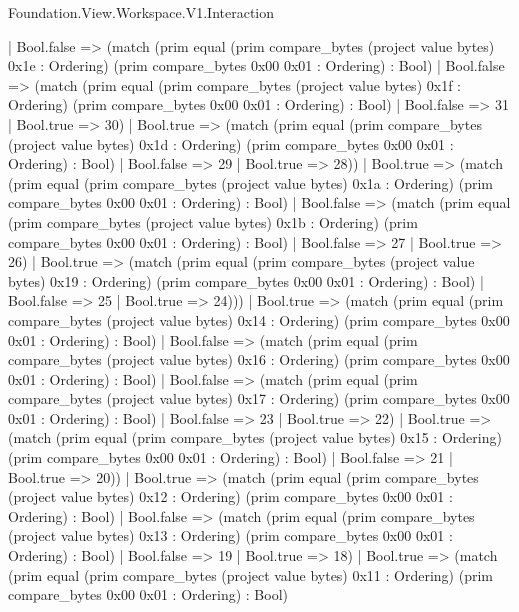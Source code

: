 \begin{lexlean}{Foundation.View.Workspace.V1.Interaction}
\begin{semanticmodule}
{                | Bool.false => (match (prim equal (prim compare_bytes (project value bytes) 0x1e : Ordering) (prim compare_bytes 0x00 0x01 : Ordering) : Bool)
                  | Bool.false => (match (prim equal (prim compare_bytes (project value bytes) 0x1f : Ordering) (prim compare_bytes 0x00 0x01 : Ordering) : Bool)
                    | Bool.false => 31
                    | Bool.true => 30)
                  | Bool.true => (match (prim equal (prim compare_bytes (project value bytes) 0x1d : Ordering) (prim compare_bytes 0x00 0x01 : Ordering) : Bool)
                    | Bool.false => 29
                    | Bool.true => 28))
                | Bool.true => (match (prim equal (prim compare_bytes (project value bytes) 0x1a : Ordering) (prim compare_bytes 0x00 0x01 : Ordering) : Bool)
                  | Bool.false => (match (prim equal (prim compare_bytes (project value bytes) 0x1b : Ordering) (prim compare_bytes 0x00 0x01 : Ordering) : Bool)
                    | Bool.false => 27
                    | Bool.true => 26)
                  | Bool.true => (match (prim equal (prim compare_bytes (project value bytes) 0x19 : Ordering) (prim compare_bytes 0x00 0x01 : Ordering) : Bool)
                    | Bool.false => 25
                    | Bool.true => 24)))
              | Bool.true => (match (prim equal (prim compare_bytes (project value bytes) 0x14 : Ordering) (prim compare_bytes 0x00 0x01 : Ordering) : Bool)
                | Bool.false => (match (prim equal (prim compare_bytes (project value bytes) 0x16 : Ordering) (prim compare_bytes 0x00 0x01 : Ordering) : Bool)
                  | Bool.false => (match (prim equal (prim compare_bytes (project value bytes) 0x17 : Ordering) (prim compare_bytes 0x00 0x01 : Ordering) : Bool)
                    | Bool.false => 23
                    | Bool.true => 22)
                  | Bool.true => (match (prim equal (prim compare_bytes (project value bytes) 0x15 : Ordering) (prim compare_bytes 0x00 0x01 : Ordering) : Bool)
                    | Bool.false => 21
                    | Bool.true => 20))
                | Bool.true => (match (prim equal (prim compare_bytes (project value bytes) 0x12 : Ordering) (prim compare_bytes 0x00 0x01 : Ordering) : Bool)
                  | Bool.false => (match (prim equal (prim compare_bytes (project value bytes) 0x13 : Ordering) (prim compare_bytes 0x00 0x01 : Ordering) : Bool)
                    | Bool.false => 19
                    | Bool.true => 18)
                  | Bool.true => (match (prim equal (prim compare_bytes (project value bytes) 0x11 : Ordering) (prim compare_bytes 0x00 0x01 : Ordering) : Bool)
}
\end{semanticmodule}
\end{lexlean}
